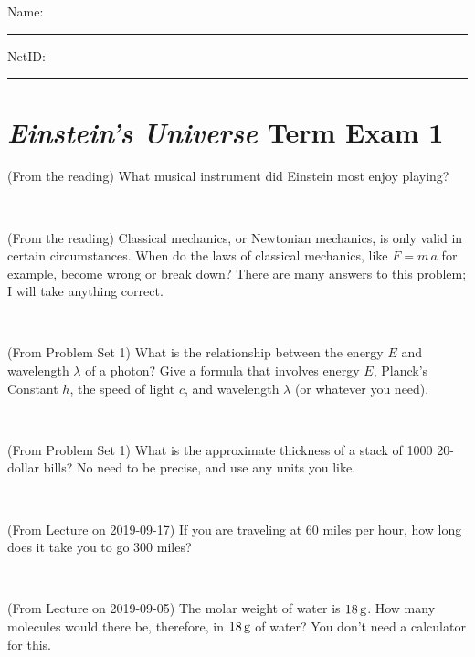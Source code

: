 \documentclass[12pt, letterpaper]{article}
\begin{document}
\noindent
Name: \rule[-1ex]{0.60\textwidth}{0.1pt}
NetID: \rule[-1ex]{0.20\textwidth}{0.1pt}

\section*{\textsl{Einstein's Universe} Term Exam 1}
\setcounter{problem}{1}


\begin{problem} (From the reading)
What musical instrument did Einstein most enjoy playing?
\end{problem}


\vfill ~

\begin{problem} (From the reading)
Classical mechanics, or Newtonian mechanics, is only valid in certain
circumstances. When do the laws of classical mechanics, like $F =
m\,a$ for example, become wrong or break down? There are many answers
to this problem; I will take anything correct.
\end{problem}


\vfill ~

\begin{problem} (From Problem Set 1)
What is the relationship between the energy $E$ and wavelength
$\lambda$ of a photon? Give a formula that involves energy $E$,
Planck's Constant $h$, the speed of light $c$, and wavelength
$\lambda$ (or whatever you need).
\end{problem}

\vfill ~

\begin{problem} (From Problem Set 1)
What is the approximate thickness of a stack of 1000 20-dollar bills?
No need to be precise, and use any units you like.
\end{problem}


\vfill ~


\clearpage


\begin{problem} (From Lecture on 2019-09-17)
If you are traveling at 60 miles per hour, how long does
it take you to go 300 miles?
\end{problem}


\vfill ~

\begin{problem} (From Lecture on 2019-09-05)
The molar weight of water is $18\,\mathrm{g}$. How many molecules would there
be, therefore, in $18\,\mathrm{g}$ of water? You don't need a calculator for
this.
\end{problem}
\end{document}
